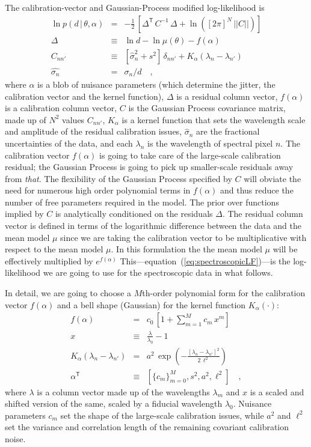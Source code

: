 \documentclass[iop,numberedappendix]{emulateapj}
\newcommand{\transpose}[1]{{#1}^{\!\mathsf T}}
\newcommand{\given}{\,|\,}
\renewcommand{\det}[1]{||{#1}||}
\begin{document}
The calibration-vector and Gaussian-Process modified log-likelihood is
\begin{eqnarray}\label{eq:spectroscopicLF}
\ln p(d\given\theta,\alpha) &=&
                                -\frac{1}{2}\,\left[\transpose{\Delta}\,C^{-1}\,\Delta
                                + \ln([2\pi]^N\,\det{C}) \right]
\\
\Delta &\equiv& \ln d - \ln \mu(\theta) - f(\alpha) 
\\
C_{nn'} &\equiv& [\hat{\sigma}_n^2 + s^2]\,\delta_{nn'} +
K_\alpha(\lambda_n - \lambda_{n'})
\\
\hat{\sigma_n} & = &\sigma_n/d
\quad ,
\end{eqnarray}
where $\alpha$ is a blob of nuisance parameters
(which determine the jitter, the calibration vector and the kernel function),
$\Delta$ is a residual column vector,
$f(\alpha)$ is a calibration column vector,
$C$ is the Gaussian Process covariance matrix,
made up of $N^2$ values $C_{nn'}$,
$K_\alpha$ is a kernel function that sets the wavelength scale and
amplitude of the residual calibration issues,
$\hat{\sigma}_n$ are the fractional uncertainties of the data,
and each $\lambda_n$ is the wavelength of spectral pixel $n$.
The calibration vector $f(\alpha)$ is going to take care of the
large-scale calibration residual; the Gaussian Process is going to
pick up smaller-scale residuals away from \emph{that}.
The flexibility of the Gaussian Process specified by $C$ will obviate
the need for numerous high order polynomial terms in $f(\alpha)$ and
thus reduce the number of free parameters required in the model.  The
prior over functions implied by $C$ is analytically conditioned on the
residuals $\Delta$.
The residual column vector is defined in terms of the logarithmic
difference between the data and the mean model $\mu$ since we are
taking the calibration vector to be multiplicative with respect to the
mean model $\mu$. In this formulation the the mean model $\mu$ will be
effectively multiplied by $e ^{f(\alpha)}$
This---equation~(\ref{eq:spectroscopicLF})---is the log-likelihood we
are going to use for the spectroscopic data in what follows.

In detail, we are going to choose a $M$th-order polynomial form for
the calibration vector $f(\alpha)$ and a bell shape (Gaussian) for the
kernel function $K_\alpha(\cdot)$:
\begin{eqnarray}\displaystyle
f(\alpha) &=& c_0\,[1 + \sum_{m=1}^M c_m\,x^m]
\\
x &\equiv& \frac{\lambda}{\lambda_0} - 1
\\
K_\alpha(\lambda_n - \lambda_{n'}) &=& a^2\,\exp(-\frac{[\lambda_n - \lambda_{n'}]^2}{2\,\ell^2})
\\
\transpose{\alpha} &\equiv& \left[ \{c_m\}_{m=0}^M, s^2, a^2, \ell^2 \right]
\quad ,
\end{eqnarray}
where $\lambda$ is a column vector made up of the wavelengths $\lambda_m$
and $x$ is a scaled and shifted version of the same,
scaled by a fiducial wavelength $\lambda_0$.
Nuisance parameters $c_m$ set the shape of the large-scale calibration
issues, while $a^2$ and $\ell^2$ set the variance and correlation
length of the remaining covariant calibration noise.
\end{document}
